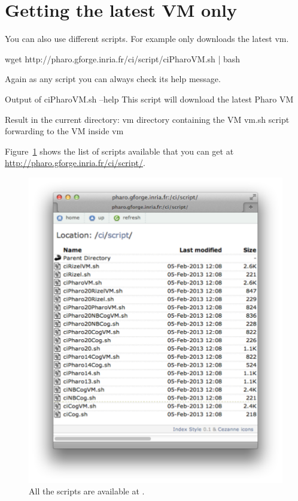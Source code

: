 \documentclass[a4paper,10pt,twoside]{book}
\begin{document}
\section{Getting the latest VM only}
You can also use different scripts. For example  only downloads the latest vm.

\begin{code}{}
wget http://pharo.gforge.inria.fr/ci/script/ciPharoVM.sh | bash
\end{code}

Again as any script you can always check its help message.

\begin{code}{Output of ciPharoVM.sh --help}
This script will download the latest Pharo VM

Result in the current directory:
    vm                 directory containing the VM
    vm.sh            script forwarding to the VM inside vm
\end{code}


Figure~\ref{fig:website} shows the list of scripts available that you can get at \url{http://pharo.gforge.inria.fr/ci/script/}.

\begin{figure}[!h]
	\centering
	\includegraphics[width=\textwidth]{webSite}
	\caption{All the scripts are available at  \label{fig:website}.}
\end{figure}
\end{document}
